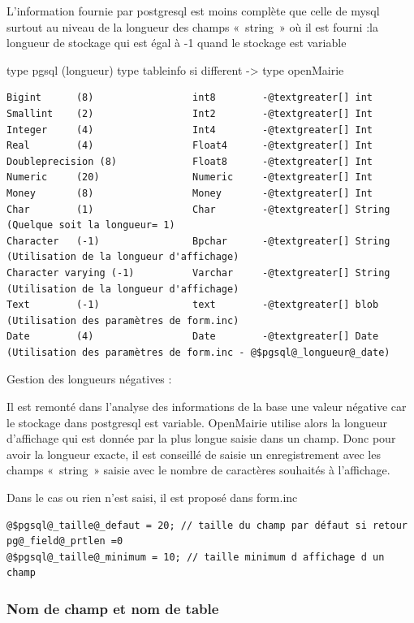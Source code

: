\documentclass[letterpaper,10pt,french]{manual}
\begin{document}
L'information fournie par postgresql est moins complète que celle de mysql surtout au niveau de la longueur des champs « string » où il est fourni :la longueur de stockage  qui est égal à -1 quand le stockage est variable

type pgsql (longueur) type tableinfo si different -\textgreater{} type openMairie

\begin{Verbatim}[commandchars=@\[\]]
Bigint      (8)                 int8        -@textgreater[] int
Smallint    (2)                 Int2        -@textgreater[] Int
Integer     (4)                 Int4        -@textgreater[] Int
Real        (4)                 Float4      -@textgreater[] Int
Doubleprecision (8)             Float8      -@textgreater[] Int
Numeric     (20)                Numeric     -@textgreater[] Int
Money       (8)                 Money       -@textgreater[] Int
Char        (1)                 Char        -@textgreater[] String   (Quelque soit la longueur= 1)
Character   (-1)                Bpchar      -@textgreater[] String (Utilisation de la longueur d'affichage)
Character varying (-1)          Varchar     -@textgreater[] String (Utilisation de la longueur d'affichage)
Text        (-1)                text        -@textgreater[] blob  (Utilisation des paramètres de form.inc)
Date        (4)                 Date        -@textgreater[] Date (Utilisation des paramètres de form.inc - @$pgsql@_longueur@_date)
\end{Verbatim}

Gestion des longueurs négatives :

Il est remonté dans l'analyse des informations de la base une valeur négative car le stockage dans postgresql est variable.
OpenMairie utilise alors la longueur d'affichage qui est donnée par la plus longue saisie dans un champ. Donc pour avoir la longueur exacte, il est conseillé de saisie un enregistrement avec les champs « string » saisie avec le nombre de caractères souhaités à l'affichage.

Dans le cas ou rien n'est saisi, il est proposé dans form.inc

\begin{Verbatim}[commandchars=@\[\]]
@$pgsql@_taille@_defaut = 20; // taille du champ par défaut si retour pg@_field@_prtlen =0
@$pgsql@_taille@_minimum = 10; // taille minimum d affichage d un champ
\end{Verbatim}


\subsubsection{Nom de champ et nom de table}
\end{document}

